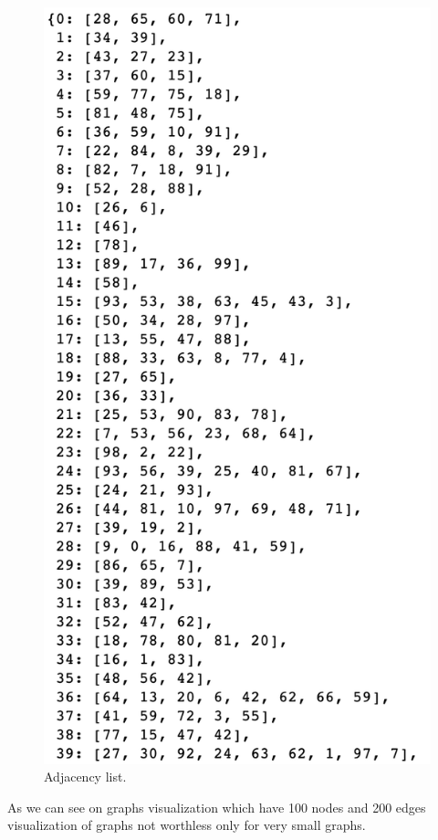 \documentclass[a4paper,article,14pt]{extarticle}
\begin{document}
	\begin{figure}[h!]
		\centering
		\includegraphics[scale=0.35]{adjacency_list.png}
		\caption{Adjacency list.}
		\label{list}
	\end{figure} 

	As we can see on graphs visualization which have 100 nodes and 200 edges visualization of graphs not worthless only for very small graphs. 
	
\end{document}
